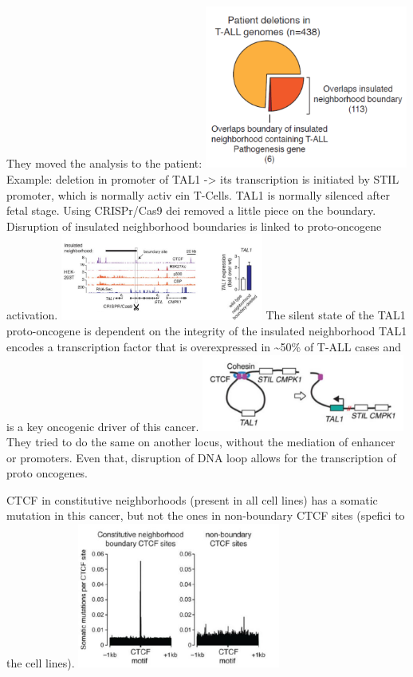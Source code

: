 They moved the analysis to the patient:
\includegraphics[width=0.5\textwidth]{../_resources/136f0b94b4833b6365281beb09fdd985.png}
Example: deletion in promoter of TAL1 -\textgreater{} its transcription is initiated by STIL promoter, which is normally activ ein T-Cells. TAL1 is normally silenced after fetal stage.
Using CRISPr/Cas9 dei removed a little piece on the boundary. Disruption of insulated neighborhood boundaries is linked to proto-oncogene activation.
\includegraphics[width=0.5\textwidth]{../_resources/bf32b9679af0fb7fcba57b9f87bb4207.png}
The silent state of the TAL1 proto-oncogene is dependent on the integrity of the insulated neighborhood TAL1 encodes a transcription factor that is overexpressed in \textasciitilde50\% of T-ALL cases and is a key oncogenic driver of this cancer.
\includegraphics[width=0.5\textwidth]{../_resources/3d83d920d425aa5f76bdbb127596c02b.png}
They tried to do the same on another locus, without the mediation of enhancer or promoters. Even that, disruption of DNA loop allows for the transcription of proto oncogenes.

CTCF in constitutive neighborhoods (present in all cell lines) has a somatic mutation in this cancer, but not the ones in non-boundary CTCF sites (spefici to the cell lines). \includegraphics[width=0.5\textwidth]{../_resources/04f2803be336c87ba295bb898a04c3e7.png}

